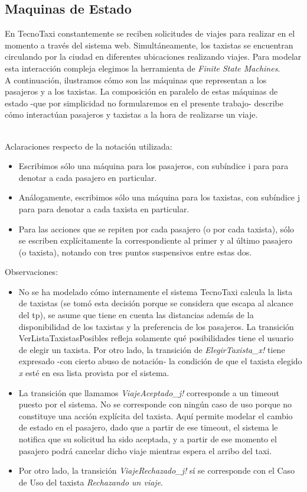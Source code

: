 \subsection{Maquinas de Estado}

En TecnoTaxi constantemente se reciben solicitudes de viajes para realizar en el momento a 
través del sistema web. Simultáneamente, los taxistas se encuentran circulando por la ciudad 
en diferentes ubicaciones realizando viajes. Para modelar esta interacción compleja 
elegimos la herramienta de \textit{Finite State Machines}.
\\
A continuación, ilustramos cómo son las máquinas que representan a los pasajeros y a los 
taxistas. La composición en paralelo de estas máquinas de estado -que por simplicidad no 
formularemos en el presente trabajo- describe cómo interactúan pasajeros y taxistas a la 
hora de realizarse un viaje.

\vspace*{0.5cm}
\\Aclaraciones respecto de la notación utilizada:
\begin{itemize}
\item Escribimos sólo una máquina para los pasajeros, con subíndice i para para denotar a 
cada pasajero en particular.
\item Análogamente, escribimos sólo una máquina para los taxistas, con subíndice j para para 
denotar a cada taxista en particular.
\item Para las acciones que se repiten por cada pasajero (o por cada taxista), sólo se escriben explícitamente la correspondiente al primer y al último pasajero (o taxista), notando con tres puntos suspensivos entre estas dos.
\end{itemize}
\vspace{0.5cm}
Observaciones:
\begin{itemize}
\item No se ha modelado cómo internamente el sistema TecnoTaxi calcula la lista de taxistas (se tomó esta decisión porque se considera que escapa al alcance del tp), se asume que tiene en cuenta las distancias además de la disponibilidad de los taxistas y la preferencia de los pasajeros. La transición VerListaTaxistasPosibles refleja solamente qué posibilidades tiene el usuario de elegir un taxista. Por otro lado, la transición de \textit{ElegirTaxista\_x!} tiene expresado -con cierto abuso de notación- la condición de que el taxista elegido \textit{x} esté en esa lista provista por el sistema.
\item La transición que llamamos \textit{ViajeAceptado\_j!} corresponde a un timeout puesto por el sistema. No se corresponde con ningún caso de uso porque no constituye una acción explícita  del taxista. Aquí permite modelar el cambio de estado en el pasajero, dado que a partir de ese timeout, el sistema le notifica que su solicitud ha sido aceptada, y a partir de ese momento el pasajero podrá cancelar dicho viaje mientras espera el arribo del taxi.
\item Por otro lado, la transición \textit{ViajeRechazado\_j!} sí se corresponde con el Caso de Uso del taxista \textit{Rechazando un viaje}.
\end{itemize}

